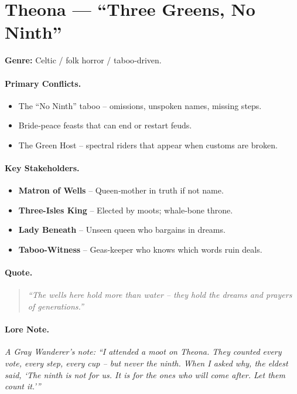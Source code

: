 \section{Theona — “Three Greens, No Ninth”}
\textbf{Genre:} Celtic / folk horror / taboo‑driven.

\paragraph{Primary Conflicts.}
\begin{itemize}
  \item The “No Ninth” taboo – omissions, unspoken names, missing steps.
  \item Bride‑peace feasts that can end or restart feuds.
  \item The Green Host – spectral riders that appear when customs are broken.
\end{itemize}

\paragraph{Key Stakeholders.}
\begin{itemize}
  \item \textbf{Matron of Wells} – Queen‑mother in truth if not name.
  \item \textbf{Three-Isles King} – Elected by moots; whale‑bone throne.
  \item \textbf{Lady Beneath} – Unseen queen who bargains in dreams.
  \item \textbf{Taboo-Witness} – Geas‑keeper who knows which words ruin deals.
\end{itemize}

\paragraph{Quote.}
\begin{quote}
\emph{“The wells here hold more than water – they hold the dreams and prayers of generations.”}
\end{quote}

\paragraph{Lore Note.}
\emph{A Gray Wanderer’s note: “I attended a moot on Theona. They counted every vote, every step, every cup – but never the ninth. When I asked why, the eldest said, ‘The ninth is not for us. It is for the ones who will come after. Let them count it.’”}

